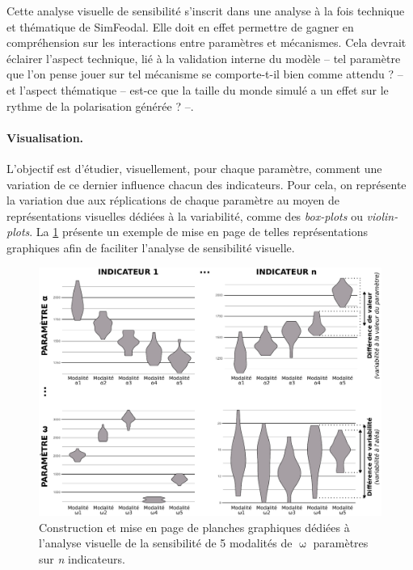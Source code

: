 Cette analyse visuelle de sensibilité s'inscrit dans une analyse à la fois technique et thématique de SimFeodal.
Elle doit en effet permettre de gagner en compréhension sur les interactions entre paramètres et mécanismes.
Cela devrait éclairer l'aspect technique, lié à la validation interne du modèle -- tel paramètre que l'on pense jouer sur tel mécanisme se comporte-t-il bien comme attendu ? -- et l'aspect thématique -- est-ce que la taille du monde simulé a un effet sur le rythme de la polarisation générée ? --.


\paragraph{Visualisation.}

L'objectif est d'étudier, visuellement, pour chaque paramètre, comment une variation de ce dernier influence chacun des indicateurs.
Pour cela, on représente la variation due aux réplications de chaque paramètre au moyen de représentations visuelles dédiées à la variabilité, comme des \textit{box-plots} ou \textit{violin-plots}.
La \cref{fig:exemple-visu-sensib} présente un exemple de mise en page de telles représentations graphiques afin de faciliter l'analyse de sensibilité visuelle.
\begin{figure}[H]
	\centering
	\includegraphics[width=\linewidth]{img/schema_violinplots_sensib.pdf}
	\caption[Construction et mise en page de planches graphiques dédiées à l'analyse visuelle de la sensibilité.]{Construction et mise en page de planches graphiques dédiées à l'analyse visuelle de la sensibilité de 5 modalités de $\upomega$ paramètres sur \textit{n} indicateurs.}
	\label{fig:exemple-visu-sensib}
\end{figure}

